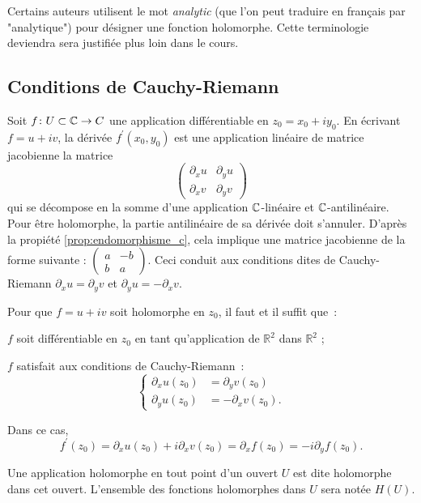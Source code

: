 \begin{rem}
Certains auteurs utilisent le mot \textit{analytic} (que l'on peut traduire en français par "analytique") pour désigner une fonction holomorphe. 
Cette terminologie deviendra sera justifiée plus loin dans le cours.
\end{rem}

\subsection{Conditions de Cauchy-Riemann}
Soit $f \colon U \subset \mathbb{C} \to C$ une application différentiable en $z_0=x_0 +i y_0$. En écrivant $f=u + i v$, la dérivée $f^\prime (x_0,y_0)$ est une application linéaire de matrice jacobienne la matrice
\[\begin{pmatrix} \partial_x u &  \partial_y u \\ \partial_x v &  \partial_y v \end{pmatrix} \]
qui se décompose en la somme d'une application $\mathbb{C}$-linéaire et $\mathbb{C}$-antilinéaire. Pour être holomorphe, la partie antilinéaire de sa dérivée doit s'annuler. D'après la propiété \ref{prop:endomorphisme_c}, cela implique une matrice jacobienne de la forme suivante : $\begin{pmatrix} a &  -b  \\ b &  a \end{pmatrix}$. Ceci conduit aux conditions dites de Cauchy-Riemann $\partial_x u=\partial_y v$ et $\partial_y u=-\partial_x v$.

\begin{fprop}\label{prop:hol_1}
Pour que $f=u + i v$ soit holomorphe en $z_0$, il faut et il suffit que~:
\begin{MYenumerate}
\item $f$ soit différentiable en $z_0$ en tant qu'application de $\mathbb{R}^2$ dans $\mathbb{R}^2$ ;
\item $f$ satisfait aux conditions de Cauchy-Riemann~:
\[\begin{cases}
\partial_x u(z_0) &= \partial_y v(z_0)  \\
\partial_y u(z_0) &= - \partial_x v(z_0).
\end{cases}\]
\end{MYenumerate}
Dans ce cas, 
\[f^\prime(z_0)=\partial_x u(z_0) + i \partial_x v(z_0) = \partial_x f(z_0)=-i \partial_y f(z_0).  \]
\end{fprop}

\begin{fdefn}
Une application holomorphe en tout point d'un ouvert $U$ est dite holomorphe dans cet ouvert. L'ensemble des fonctions holomorphes dans $U$ sera notée $H(U)$.
\end{fdefn}


